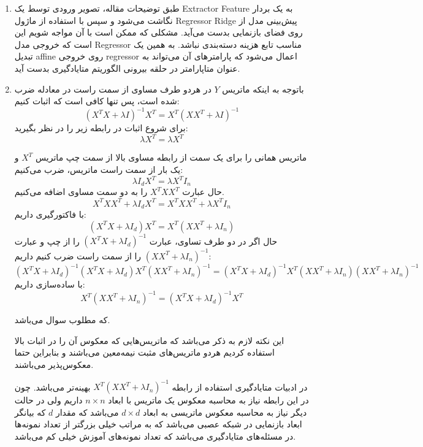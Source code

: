 \documentclass{article}
\begin{document}
\begin{enumerate}
	\item
	
	طبق توضیحات مقاله،‌ تصویر ورودی توسط یک
	Extractor Feature
	به یک بردار نگاشت می‌شود و سپس با استفاده از ماژول
	Regressor Ridge
	پیش‌بینی مدل از روی فضای بازنمایی بدست می‌آید. مشکلی که ممکن است با آن مواجه شویم این است که خروجی مدل
	Regressor
	مناسب تابع هزینه دسته‌بندی نباشد. به همین یک تبدیل affine روی خروجی regressor اعمال می‌شود که پارامترهای آن می‌تواند به عنوان متاپارامتر در حلقه بیرونی الگوریتم متایادگیری بدست آید.
	
	\item
	باتوجه به اینکه ماتریس $Y$ در هردو طرف مساوی از سمت راست در معادله ضرب شده است،‌ پس تنها کافی است که اثبات کنیم:
	$$
	{\left( {{X^T}X + \lambda I} \right)^{ - 1}}{X^T} = {X^T}{\left( {X{X^T} + \lambda I} \right)^{ - 1}}
	$$
	برای شروع اثبات در رابطه زیر را در نظر بگیرید:
	$$
	\lambda {X^T} = \lambda {X^T}
	$$
	
	ماتریس همانی را برای یک سمت از رابطه مساوی بالا از سمت چپ ماتریس 
	${X^T}$
	و یک بار از سمت راست ماتریس،‌ ضرب می‌کنیم:
	$$
	\lambda {I_d}{X^T} = \lambda {X^T}{I_n}
	$$
	حال عبارت
	${X^T}X{X^T}$
	را به دو سمت مساوی اضافه می‌کنیم.
	$$
	{X^T}X{X^T} + \lambda {I_d}{X^T} = {X^T}X{X^T} + \lambda {X^T}{I_n}
	$$
	با فاکتورگیری داریم:
	$$
	\left( {{X^T}X + \lambda {I_d}} \right){X^T} = {X^T}\left( {X{X^T} + \lambda {I_n}} \right)
	$$
	حال اگر در دو طرف تساوی، عبارت
	${\left( {{X^T}X + \lambda {I_d}} \right)^{ - 1}}$
	را از چپ و عبارت
	${\left( {X{X^T} + \lambda {I_n}} \right)^{ - 1}}$
	را از سمت راست ضرب کنیم داریم:
	$$
	{\left( {{X^T}X + \lambda {I_d}} \right)^{ - 1}}\left( {{X^T}X + \lambda {I_d}} \right){X^T}{\left( {X{X^T} + \lambda {I_n}} \right)^{ - 1}} = {\left( {{X^T}X + \lambda {I_d}} \right)^{ - 1}}{X^T}\left( {X{X^T} + \lambda {I_n}} \right){\left( {X{X^T} + \lambda {I_n}} \right)^{ - 1}}
	$$
	با ساده‌سازی داریم:
	$$
	{X^T}{\left( {X{X^T} + \lambda {I_n}} \right)^{ - 1}} = {\left( {{X^T}X + \lambda {I_d}} \right)^{ - 1}}{X^T}
	$$
	
	که مطلوب سوال می‌باشد.
	
	این نکته لازم به ذکر می‌باشد که ماتریس‌هایی که معکوس آن را در اثبات بالا استفاده کردیم هردو ماتریس‌های مثبت نیمه‌معین می‌باشند و بنابراین حتما معکوس‌پذیر می‌باشند.
	
	در ادبیات متایادگیری استفاده از رابطه
	${X^T}{\left( {X{X^T} + \lambda {I_n}} \right)^{ - 1}}$
	بهینه‌تر می‌باشد. چون در این رابطه نیاز به محاسبه معکوس یک ماتریس با ابعاد
	$n \times n$
	داریم ولی در حالت دیگر نیاز به محاسبه معکوس ماتریسی به ابعاد
	$d \times d$
	می‌باشد که مقدار $d$ که بیانگر ابعاد بازنمایی در شبکه عصبی می‌باشد که به مراتب خیلی بزرگتر از تعداد نمونه‌ها در مسئله‌های متایادگیری می‌باشد که تعداد نمونه‌های آموزش خیلی کم می‌باشد.
	

\end{enumerate}
\end{document}
